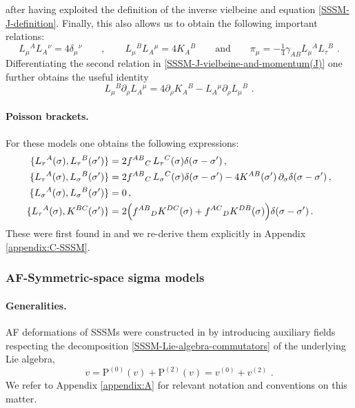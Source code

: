 \documentclass[12pt]{article}
\numberwithin{equation}{section}
\begin{document}
after having exploited the definition of the inverse vielbeine and equation \eqref{SSSM-J-definition}. Finally, this also allows us to obtain the following important relations:
\begin{equation}\label{SSSM-J-vielbeine-and-momentum(J)}
L_{\mu}{}^{A}L_{A}{}^{\nu}=4\delta_{\mu}{}^{\nu} \qquad , \qquad L_{\mu}{}^{B}L_{A}{}^{\mu}=4K_{A}{}^{B} \qquad \text{and} \qquad \pi_{\mu}=-\tfrac{1}{4}\gamma_{AB}L_{\mu}{}^{A}L_{\tau}{}^{B}\,\, .
\end{equation}
Differentiating the second relation in \eqref{SSSM-J-vielbeine-and-momentum(J)} one further obtains the useful identity
\begin{equation}\label{SSSM-useful-relation}
L_{\mu}{}^{B}\partial_{\rho}L_{A}{}^{\mu}=4\partial_{\rho}K_{A}{}^{B}-L_{A}{}^{\mu}\partial_{\rho}L_{\mu}{}^{B} \,\, .
\end{equation}



\paragraph{Poisson brackets.}
For these models one obtains the following expressions:
\begin{equation}\label{SSSM-brackets-summary}
\begin{aligned}
\{ L_{\tau}{}^{A}(\sigma),L_{\tau}{}^{B}(\sigma') \} &= 2f^{AB}{}_{C} \, L_{\tau}{}^{C}(\sigma)\delta(\sigma-\sigma') \, ,
\\
\{ L_{\tau}{}^{A}(\sigma),L_{\sigma}{}^{B}(\sigma') \} &= 2f^{AB}{}_{C} \, L_{\sigma}{}^{C}(\sigma)\delta(\sigma-\sigma')-4K^{AB}(\sigma') \, \partial_{\sigma}\delta(\sigma-\sigma') \, ,
\\
\{ L_{\sigma}{}^{A}(\sigma),L_{\sigma}{}^{B}(\sigma') \} &= 0 \, ,
\\
\{ L_{\tau}{}^{A}(\sigma),K^{BC}(\sigma') \} &= 2\Bigl(f^{AB}{}_{D}K^{DC}(\sigma)+f^{AC}{}_{D}K^{DB}(\sigma)\Bigr)\delta(\sigma-\sigma') \,  .
\end{aligned}
\end{equation}
These were first found in \cite{Forger:1991cm} and we re-derive them explicitly in Appendix \ref{appendix:C-SSSM}.




\subsubsection{AF-Symmetric-space sigma models}\label{subsubsec:AFSSSM}
\paragraph{Generalities.}
AF deformations of SSSMs were constructed in \cite{Bielli:2024oif,Cesaro:2024ipq} by introducing auxiliary fields respecting the decomposition \eqref{SSSM-Lie-algebra-commutators} of the underlying Lie algebra,
\begin{equation}
v=\mathrm{P}^{(0)}(v)+\mathrm{P}^{(2)}(v)=v^{(0)}+v^{(2)} \,\, .
\end{equation} 
We refer to Appendix \ref{appendix:A} for relevant notation and conventions on this matter.
\end{document}
